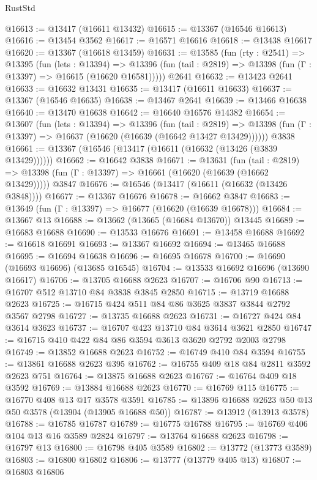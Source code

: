 \begin{lexlean}{RustStd}
\begin{coremodule}
@16613 := @13417 (@16611 @13432)
@16615 := @13367 (@16546 @16613)
@16616 := @13454 @3562
@16617 := @16571 @16616
@16618 := @13438 @16617
@16620 := @13367 (@16618 @13459)
@16631 := @13585
    (fun (rty : @2541) =>
    @13395
      (fun (lets : @13394) =>
      @13396 (fun (tail : @2819) => @13398 (fun (Γ : @13397) => @16615 (@16620 @16581)))))
    @2641
@16632 := @13423 @2641
@16633 := @16632 @13431
@16635 := @13417 (@16611 @16633)
@16637 := @13367 (@16546 @16635)
@16638 := @13467 @2641
@16639 := @13466 @16638
@16640 := @13470 @16638
@16642 := @16640 @16576 @14382
@16654 := @13607
    (fun (lets : @13394) =>
    @13396
      (fun (tail : @2819) =>
      @13398 (fun (Γ : @13397) => @16637 (@16620 (@16639 (@16642 @13427 @13429))))))
    @3838
@16661 := @13367 (@16546 (@13417 (@16611 (@16632 (@13426 (@3839 @13429))))))
@16662 := @16642 @3838
@16671 := @13631
    (fun (tail : @2819) => @13398 (fun (Γ : @13397) => @16661 (@16620 (@16639 (@16662 @13429)))))
    @3847
@16676 := @16546 (@13417 (@16611 (@16632 (@13426 @3848))))
@16677 := @13367 @16676
@16678 := @16662 @3847
@16683 := @13649 (fun (Γ : @13397) => @16677 (@16620 (@16639 @16678)))
@16684 := @13667 @13
@16688 := @13662 (@13665 (@16684 @13670)) @13445
@16689 := @16683 @16688
@16690 := @13533 @16676
@16691 := @13458 @16688
@16692 := @16618 @16691
@16693 := @13367 @16692
@16694 := @13465 @16688
@16695 := @16694 @16638
@16696 := @16695 @16678
@16700 := @16690 (@16693 @16696) (@13685 @16545)
@16704 := @13533 @16692 @16696 (@13690 @16617)
@16706 := @13705 @16688 @2623
@16707 := @16706 @90
@16713 := @16707 @512 @13710 @84 @3838 @3845 @2850
@16715 := @13719 @16688 @2623
@16725 := @16715 @424 @511 @84 @86 @3625 @3837 @3844 @2792 @3567 @2798
@16727 := @13735 @16688 @2623
@16731 := @16727 @424 @84 @3614 @3623
@16737 := @16707 @423 @13710 @84 @3614 @3621 @2850
@16747 := @16715 @410 @422 @84 @86 @3594 @3613 @3620 @2792 @2003 @2798
@16749 := @13852 @16688 @2623
@16752 := @16749 @410 @84 @3594
@16755 := @13861 @16688 @2623 @395
@16762 := @16755 @409 @18 @84 @2811 @3592 @2623 @751
@16764 := @13875 @16688 @2623
@16767 := @16764 @409 @18 @3592
@16769 := @13884 @16688 @2623
@16770 := @16769 @115
@16775 := @16770 @408 @13 @17 @3578 @3591
@16785 := @13896 @16688 @2623 @50 @13 @50 @3578 (@13904 (@13905 @16688 @50))
@16787 := @13912 (@13913 @3578)
@16788 := @16785 @16787
@16789 := @16775 @16788
@16795 := @16769 @406 @104 @13 @16 @3589 @2824
@16797 := @13764 @16688 @2623
@16798 := @16797 @13
@16800 := @16798 @405 @3589
@16802 := @13772 (@13773 @3589)
@16803 := @16800 @16802
@16806 := @13777 (@13779 @405 @13)
@16807 := @16803 @16806

\end{coremodule}
\end{lexlean}
